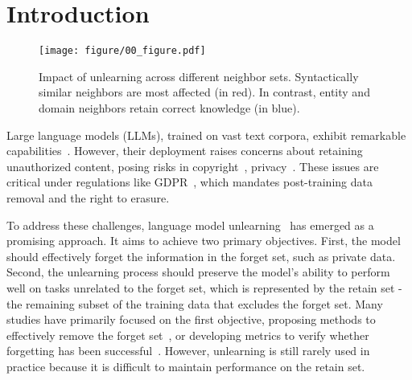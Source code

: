 \section{Introduction}
\begin{figure}[!t]
\label{fig:introFig}
\texttt{[image: figure/00\_figure.pdf]}
\vspace{-10mm}
\caption{Impact of unlearning across different neighbor sets. Syntactically similar neighbors are most affected (in red). In contrast, entity and domain neighbors retain correct knowledge (in blue).}
\label{fig:intro}
\end{figure}

Large language models (LLMs), trained on vast text corpora, exhibit remarkable capabilities~\citep{dubey2024llama3}. However, their deployment raises concerns about retaining unauthorized content, posing risks in copyright~\citep{karamolegkou2023copyrightviolation}, privacy~\citep{neel2023privacy}. These issues are critical under regulations like GDPR~\citep{voigt2017gdpr}, which mandates post-training data removal and the right to erasure.

To address these challenges, language model unlearning~\citep{yao2023llmunlearningsurvey} has emerged as a promising approach. It aims to achieve two primary objectives. First, the model should effectively forget the information in the forget set, such as private data.  Second, the unlearning process should preserve the model's ability to perform well on tasks unrelated to the forget set, which is represented by the retain set - the remaining subset of the training data that excludes the forget set. Many studies have primarily focused on the first objective, proposing methods to effectively remove the forget set~\citep{sinha2024unstar, eldan2023swhosharrypotter}, or developing metrics to verify whether forgetting has been successful~\citep{lynch2024eight, hu2024joggingthememory}. 
However, unlearning is still rarely used in practice because it is difficult to maintain performance on the retain set.

